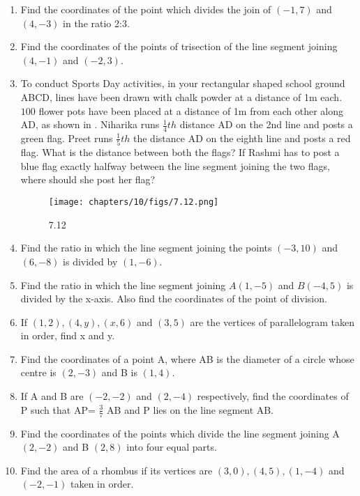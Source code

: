 \begin{enumerate}
\item Find the coordinates of the point which divides the join of $(-1,7)$ and $(4,-3)$ in the ratio 2:3.
\item Find the coordinates of the points of trisection of the line segment joining $(4,-1)$ and $(-2,3)$.
\item To conduct Sports Day activities, in your rectangular shaped school ground ABCD, lines have been drawn with chalk powder at a distance of 1m each. $100$ flower pots have been placed at a distance of 1m from each other along AD, as shown in . Niharika runs $\frac {1}{4}th$ distance AD on the 2nd line and posts a green flag. Preet runs $\frac {1}{5}th$ the distance AD on the eighth line and posts a red flag. What is the distance between both the flags? If Rashmi has to post a blue flag exactly halfway between the line segment joining the two flags, where should she post her flag?
\begin{figure}[ht]
\centering
\texttt{[image: chapters/10/figs/7.12.png]}
\caption{7.12}
  \label{fig:7.12}
\end{figure}
\item Find the ratio in which the line segment joining the points $(-3,10)$ and $(6,-8)$ is divided by $(1,-6)$.
\item Find the ratio in which the line segment joining $A(1,-5)$ and $B(-4,5)$ is divided by the x-axis. Also find the coordinates of the point of division.
\item If $(1,2), (4,y), (x,6)$ and $(3,5)$ are the vertices of parallelogram taken in order, find x and y.
\item Find the coordinates of a point A, where AB is the diameter of a circle whose centre is $(2,-3)$ and B is $(1,4)$.
\item If A and B are $(-2,-2)$ and $(2,-4)$ respectively, find the coordinates of P such that AP= $\frac {3}{7}$ AB  and P lies on the line segment AB.
\item Find the coordinates of the points which divide the line segment joining A $(2,-2)$ and B $(2,8)$ into four equal parts.
\item Find the area of a rhombus if its vertices are $(3,0), (4,5), (1,-4)$ and $(-2,-1)$ taken in order.
\end{enumerate}
